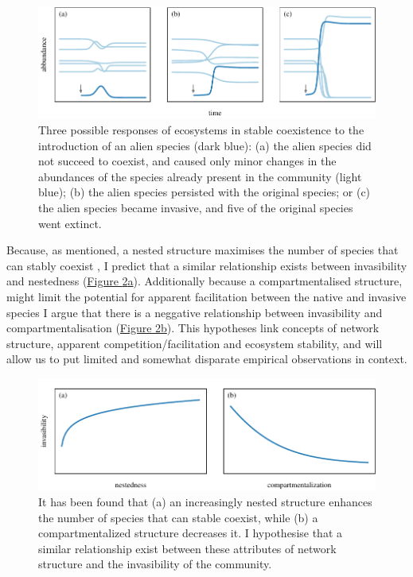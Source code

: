 \documentclass[a4paper]{article}
\begin{document}
\begin{figure}[tbp]
  \includegraphics{dynamics}
  \caption{
  \label{fig:dynamics}
  Three possible responses of ecosystems in stable coexistence to the introduction of an alien species (dark blue):
  (a) the alien species did not succeed to coexist, and caused only minor changes in the abundances of the species already present in the community (light blue);
  (b) the alien species persisted with the original species; or
  (c) the alien species became invasive, and five of the original species went extinct.
  }
\end{figure}

Because, as mentioned, a nested structure maximises the number of species that can stably coexist \autocite{Bastolla2009}, I predict that a similar relationship exists between invasibility and nestedness (\hyperref[fig:hypo_c1]{Figure \ref{fig:hypo_c1}a}).
Additionally because a compartmentalised structure, might limit the potential for apparent facilitation between the native and invasive species I argue that there is a neggative relationship between invasibility and compartmentalisation (\hyperref[fig:hypo_c1]{Figure \ref{fig:hypo_c1}b}).
This hypotheses link concepts of network structure, apparent competition/facilitation and ecosystem stability, and will allow us to put limited and somewhat disparate empirical observations in context.

\begin{figure}[tbp]
  \includegraphics{hypo_c1}
  \caption{
  \label{fig:hypo_c1}
  It has been found that (a) an increasingly nested structure enhances the number of species that can stable coexist, while (b) a compartmentalized structure decreases it.
  I hypothesise that a similar relationship exist between these attributes of network structure and the invasibility of the community.
  }
\end{figure}
\end{document}

